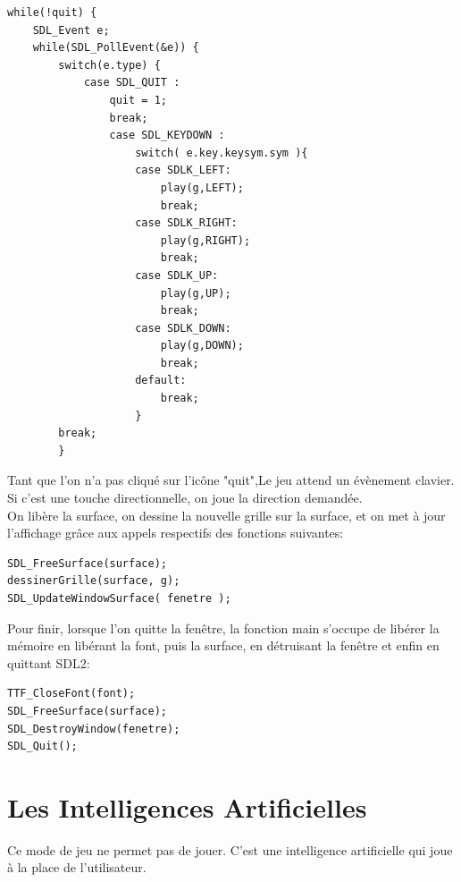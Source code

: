 \documentclass{report}
\begin{document}
\begin{lstlisting}[frame=single]
while(!quit) {
	SDL_Event e;
	while(SDL_PollEvent(&e)) {
    	switch(e.type) {
        	case SDL_QUIT :
                quit = 1;
                break;
                case SDL_KEYDOWN :
                    switch( e.key.keysym.sym ){
                    case SDLK_LEFT:
                        play(g,LEFT);
                        break;
                    case SDLK_RIGHT:
                        play(g,RIGHT);
                        break;
                    case SDLK_UP:
                        play(g,UP);
                        break;
                    case SDLK_DOWN:
                        play(g,DOWN);
                        break;
                    default:
                        break;
                    }
        break;
        }
\end{lstlisting}
Tant que l'on n'a pas cliqué sur l'icône "quit",Le jeu attend un évènement clavier. Si c'est une touche directionnelle, on joue la direction demandée.\\
On libère la surface, on dessine la nouvelle grille sur la surface, et on met à jour l'affichage grâce aux appels respectifs des fonctions suivantes:\\
\begin{lstlisting}[frame=single]
SDL_FreeSurface(surface);   
dessinerGrille(surface, g);
SDL_UpdateWindowSurface( fenetre );
\end{lstlisting}
Pour finir, lorsque l'on quitte la fenêtre, la fonction main s'occupe de libérer la mémoire en libérant la font, puis la surface, en détruisant la fenêtre et enfin en quittant SDL2:
\begin{lstlisting}[frame=single]
TTF_CloseFont(font);
SDL_FreeSurface(surface); 
SDL_DestroyWindow(fenetre); 
SDL_Quit();
\end{lstlisting}

\chapter{Les Intelligences Artificielles}
Ce mode de jeu ne permet pas de jouer. C'est une intelligence artificielle qui joue à la place de l'utilisateur.
\end{document}
